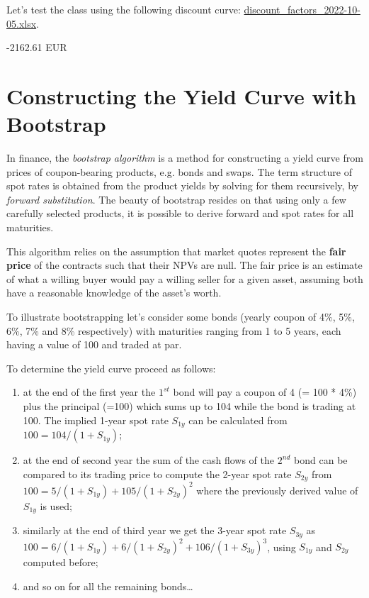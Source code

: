 Let's test the class using the following discount curve: \href{https://github.com/matteosan1/finance_course/raw/master/input_files/discount_factors_2022-10-05.xlsx}{discount\_factors\_2022-10-05.xlsx}.


\begin{ioutput}
-2162.61 EUR
\end{ioutput}

\section{Constructing the Yield Curve with Bootstrap}
\label{the-bootstrapping-technique}

In finance, the \emph{bootstrap algorithm} is a method for constructing a yield curve from prices of coupon-bearing products, e.g. bonds and swaps. The term structure of spot rates is obtained from the product yields by solving for them recursively, by \emph{forward substitution}. 
The beauty of bootstrap resides on that using only a few carefully selected products, it is possible to derive forward and spot rates for all maturities.

This algorithm relies on the assumption that market quotes represent the \textbf{fair price} of the contracts such that their NPVs are null. The fair price is an estimate of what a willing buyer would pay a willing seller for a given asset, assuming both have a reasonable knowledge of the asset's worth.

To illustrate bootstrapping let's consider some bonds (yearly coupon of 4\%, 5\%, 6\%, 7\% and 8\% respectively) with maturities ranging from 1 to 5 years, each having a value of 100 and traded at par. 

To determine the yield curve proceed as follows:
\begin{enumerate}
\item at the end of the first year the $1^{st}$ bond will pay a coupon of 4 (= 100 * 4\%) plus the principal (=100) which sums up to 104 while the bond is trading at 100. The implied 1-year spot rate $S_{1y}$ can be calculated from $\mbox{100} = \mbox{104} / (1 + S_{1y})$;

\item at the end of second year the sum of the cash flows of the $2^{nd}$ bond can be compared to its trading price to compute the 2-year spot rate $S_{2y}$ from $\mbox{100} = \mbox{5} / (1 + S_{1y}) + \mbox{105} / (1 + S_{2y})^{2}$ where the previously derived value of $S_{1y}$ is used;

\item similarly at the end of third year we get the 3-year spot rate $S_{3y}$ as $\mbox{100} = \mbox{6} / (1 + S_{1y}) + \mbox{6} / (1 + S_{2y})^{2} + \mbox{106} / (1 + S_{3y})^{3}$, using $S_{1y}$ and $S_{2y}$ computed before;

\item and so on for all the remaining bonds\ldots
\end{enumerate}

